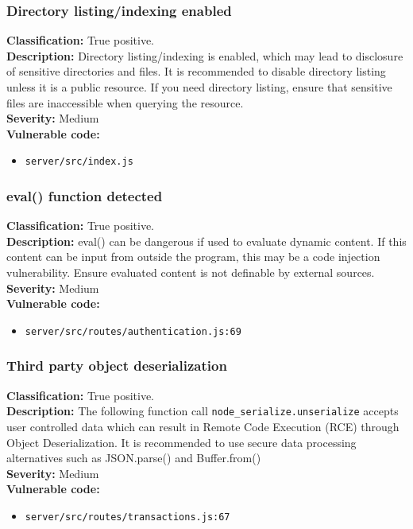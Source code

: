 \documentclass[]{article}
\begin{document}
\subsubsection{Directory listing/indexing enabled}
\textbf{Classification:} {True positive.} \\
\textbf{Description:} Directory listing/indexing is enabled, which may lead to disclosure of sensitive directories and 
          files. It is recommended to disable directory listing unless it is a public resource. If you need
          directory listing, ensure that sensitive files are inaccessible when querying the resource. \\
\textbf{Severity:}  Medium\\ 
\textbf{Vulnerable code:}
\begin{itemize}
    \item \texttt{server/src/index.js}
\end{itemize}


\subsubsection{eval() function detected}
\textbf{Classification:} {True positive.} \\
\textbf{Description:} eval() can be dangerous if used to evaluate dynamic content. If this content can be input from outside the program, this may be a code injection vulnerability. Ensure evaluated content is not definable by external sources. \\ 
\textbf{Severity:} Medium \\ 
\textbf{Vulnerable code:}
\begin{itemize}
    \item \texttt{server/src/routes/authentication.js:69}
\end{itemize}

\subsubsection{Third party object deserialization}
\textbf{Classification:} {True positive.} \\
\textbf{Description:} The following function call \texttt{node\_serialize.unserialize} accepts user controlled data which can result in Remote Code Execution (RCE) through Object Deserialization. It is recommended to use secure data processing alternatives such as JSON.parse() and Buffer.from() \\ 
\textbf{Severity:} Medium \\ 
\textbf{Vulnerable code:}
\begin{itemize}
    \item \texttt{server/src/routes/transactions.js:67}
\end{itemize}
\end{document}
